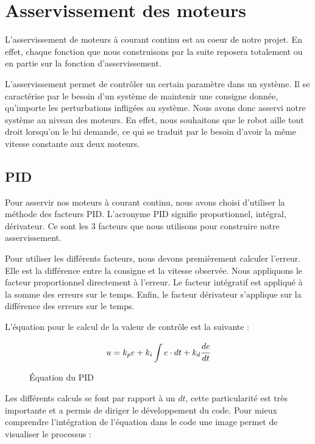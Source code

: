 \documentclass[
	a4paper,									%
	11pt,										%
	twoside,									%
	openright,									%
	notitlepage,									%
	parskip=half,								%
]{scrreprt}										%
\begin{document}
\chapter{Asservissement des moteurs}

L'asservissement de moteurs à courant continu est au coeur de notre projet. En effet, chaque fonction que nous construisons par la suite reposera totalement ou en partie sur la fonction d'asservissement. \par

L'asservissement permet de contrôler un certain paramètre dans un système. Il se caractérise par le besoin d'un système de maintenir une consigne donnée, qu'importe les perturbations infligées au système.
Nous avons donc asservi notre système au niveau des moteurs. En effet, nous souhaitons que le robot aille tout droit lorsqu'on le lui demande, ce qui se traduit par le besoin d'avoir
la même vitesse constante aux deux moteurs. \par

\section{PID}



Pour asservir nos moteurs à courant continu, nous avons choisi d'utiliser la méthode des facteurs PID. L'acronyme PID signifie proportionnel, intégral, dérivateur. Ce sont les 3 facteurs que nous 
utilisons pour construire notre asservissement. \par

Pour utiliser les différents facteurs, nous devons premièrement calculer l'erreur. Elle est la différence entre la consigne et la vitesse observée. Nous appliquons le facteur proportionnel directement à l'erreur.
Le facteur intégratif est appliqué à la somme des erreurs sur le temps. Enfin, le facteur dérivateur s'applique sur la différence des erreurs sur le temps. \par

	\begin{center}

L'équation pour le calcul de la valeur de contrôle est la suivante : 
		\begin{figure}[h]
			\[u=k_pe + k_i \int e \cdot dt + k_d \cfrac{de}{dt}\] 
			\caption{Équation du PID}
			\label{eq1}
		\end{figure}
	\end{center} 

Les différents calculs se font par rapport à un $dt$, cette particularité est très importante et a permis de diriger le développement du code. Pour mieux comprendre l'intégration de l'équation dans le code 
une image permet de visualiser le processus : 
\end{document}
